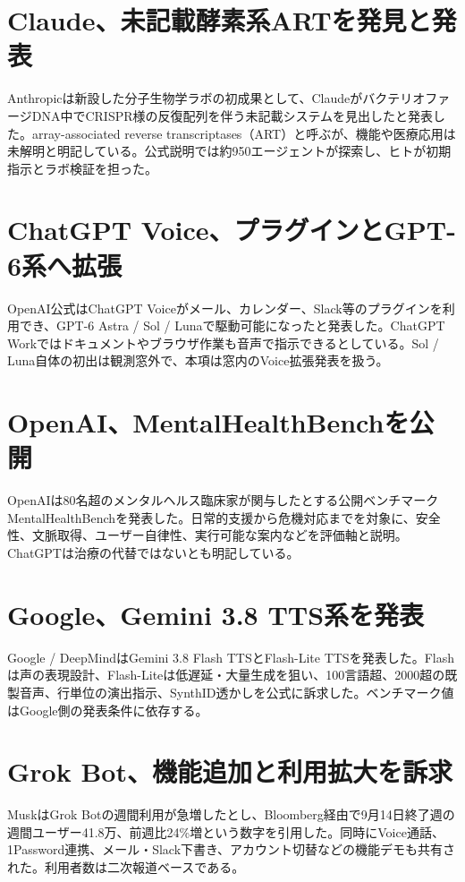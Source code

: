 \section{Claude、未記載酵素系ARTを発見と発表}
Anthropicは新設した分子生物学ラボの初成果として、ClaudeがバクテリオファージDNA中でCRISPR様の反復配列を伴う未記載システムを見出したと発表した。array-associated reverse transcriptases（ART）と呼ぶが、機能や医療応用は未解明と明記している。公式説明では約950エージェントが探索し、ヒトが初期指示とラボ検証を担った。

\section{ChatGPT Voice、プラグインとGPT-6系へ拡張}
OpenAI公式はChatGPT Voiceがメール、カレンダー、Slack等のプラグインを利用でき、GPT-6 Astra / Sol / Lunaで駆動可能になったと発表した。ChatGPT Workではドキュメントやブラウザ作業も音声で指示できるとしている。Sol / Luna自体の初出は観測窓外で、本項は窓内のVoice拡張発表を扱う。

\section{OpenAI、MentalHealthBenchを公開}
OpenAIは80名超のメンタルヘルス臨床家が関与したとする公開ベンチマークMentalHealthBenchを発表した。日常的支援から危機対応までを対象に、安全性、文脈取得、ユーザー自律性、実行可能な案内などを評価軸と説明。ChatGPTは治療の代替ではないとも明記している。

\section{Google、Gemini 3.8 TTS系を発表}
Google / DeepMindはGemini 3.8 Flash TTSとFlash-Lite TTSを発表した。Flashは声の表現設計、Flash-Liteは低遅延・大量生成を狙い、100言語超、2000超の既製音声、行単位の演出指示、SynthID透かしを公式に訴求した。ベンチマーク値はGoogle側の発表条件に依存する。

\section{Grok Bot、機能追加と利用拡大を訴求}
MuskはGrok Botの週間利用が急増したとし、Bloomberg経由で9月14日終了週の週間ユーザー41.8万、前週比24\%増という数字を引用した。同時にVoice通話、1Password連携、メール・Slack下書き、アカウント切替などの機能デモも共有された。利用者数は二次報道ベースである。

